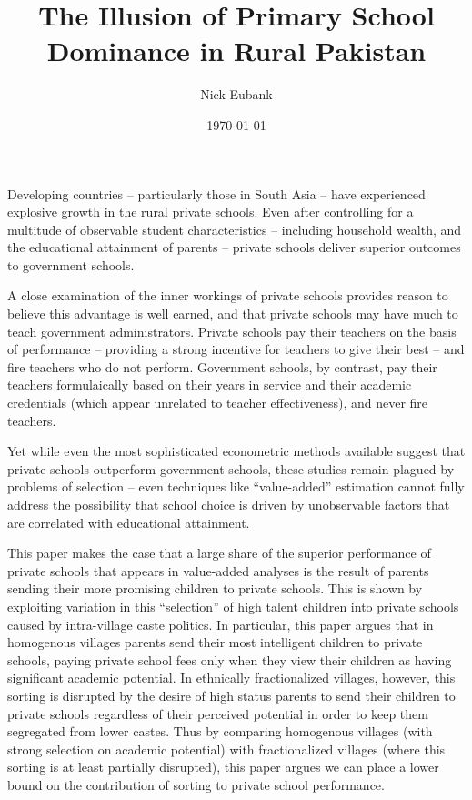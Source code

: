 \documentclass[12pt]{article}
\title{The Illusion of Primary School Dominance in Rural Pakistan}
\author{Nick Eubank}
\date{\today}
\begin{document}
 
\maketitle

Developing countries -- particularly those in South Asia -- have experienced explosive growth in the rural private schools. Even after controlling for a multitude of observable student characteristics -- including household wealth, and the educational attainment of parents -- private schools deliver superior outcomes to government schools. 

A close examination of the inner workings of private schools provides reason to believe this advantage is well earned, and that private schools may have much to teach government administrators. Private schools pay their teachers on the basis of performance -- providing a strong incentive for teachers to give their best -- and fire teachers who do not perform. Government schools, by contrast, pay their teachers formulaically based on their years in service and their academic credentials (which appear unrelated to teacher effectiveness), and never fire teachers.  

Yet while even the most sophisticated econometric methods available suggest that private schools outperform government schools, these studies remain plagued by problems of selection -- even techniques like ``value-added'' estimation cannot fully address the possibility that school choice is driven by unobservable factors that are correlated with educational attainment. 

This paper makes the case that a large share of the superior performance of private schools that appears in value-added analyses is the result of parents sending their more promising children to private schools. This is shown by exploiting variation in this ``selection'' of high talent children into private schools caused by intra-village caste politics. In particular, this paper argues that in homogenous villages parents send their most intelligent children to private schools, paying private school fees only when they view their children as having significant academic potential. In ethnically fractionalized villages, however, this sorting is disrupted by the desire of high status parents to send their children to private schools regardless of their perceived potential in order to keep them segregated from lower castes. Thus by comparing homogenous villages (with strong selection on academic potential) with fractionalized villages (where this sorting is at least partially disrupted), this paper argues we can place a lower bound on the contribution of sorting to private school performance. 
\end{document}
